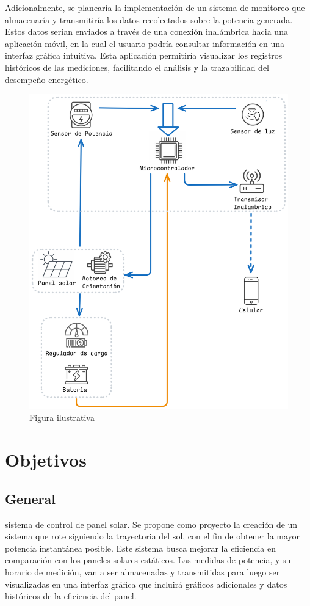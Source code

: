 \documentclass[a4paper,12pt]{article}
\begin{document}
Adicionalmente, se planearía la implementación de un sistema de monitoreo que almacenaría y transmitiría los datos recolectados sobre la potencia generada. Estos datos serían enviados a través de una conexión inalámbrica hacia una aplicación móvil, en la cual el usuario podría consultar información en una interfaz gráfica intuitiva. Esta aplicación permitiría visualizar los registros históricos de las mediciones, facilitando el análisis y la trazabilidad del desempeño energético.\\

\begin{figure}[h!]
    \centering
    \includegraphics[width=0.7\linewidth]{diagrama_proyecto.png}
    \caption{Figura ilustrativa}
    \label{fig:enter-label}
\end{figure}


\section{Objetivos}
\subsection{General}

sistema de control de panel solar. Se propone como proyecto la creación de un sistema que rote siguiendo la trayectoria del sol, con el fin de obtener la mayor potencia instantánea posible. Este sistema busca mejorar la eficiencia en comparación con los paneles solares estáticos. Las medidas de potencia, y su horario de medición, van a ser almacenadas y transmitidas para luego ser visualizadas en una interfaz gráfica que incluirá gráficos adicionales y datos históricos de la eficiencia del panel.
\end{document}
